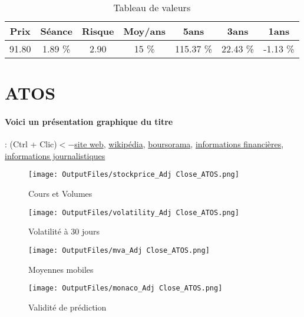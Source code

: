 \documentclass[11pt,a4paper]{report}%
\begin{document}
\begin{table}[H]
  \centering
    \begin{tabular}{|c|c|c|c|c|c|c|}
    \hline
    Prix & Séance & Risque  & Moy/ans & 5ans & 3ans & 1ans \\
    \hline
    91.80 &    1.89 \%    & 2.90 & 15 \% & 115.37 \% & 22.43 \% & -1.13 \% \\
    \hline
    \end{tabular}%
        \label{tab:table_ALTEN}%
      \caption{Tableau de valeurs}
\end{table}%

\newpage

\section{ATOS}

\paragraph{Voici un présentation graphique du titre} : (Ctrl + Clic)$<-$\href{https://atos.net/fr/investisseurs}{site web}, \href{https://fr.wikipedia.org/wiki/Atos}{wikipédia}, \href{https://www.boursorama.com/cours/1rPATO}{boursorama}, \href{https://www.qwant.com/?q=site:https:%2f%2fwww.easybourse.com%2faction-societe%2fATOS&t=web&client=ext-firefox-hp}{informations financières}, \href{https://bourse.lerevenu.com/cours-de-bourse/fiche-valeur-synthese/ATOS/ATO-FR}{informations journalistiques}
\begin{figure}[!htb]
   \begin{minipage}{0.5\textwidth}
     \centering
     \texttt{[image: OutputFiles/stockprice\_Adj Close\_ATOS.png]}
     \caption{Cours et Volumes}\label{Fig:price_ATOS}
   \end{minipage}\hfill
   \begin{minipage}{0.5\textwidth}
     \centering
     \texttt{[image: OutputFiles/volatility\_Adj Close\_ATOS.png]}
     \caption{Volatilité à 30 jours}\label{Fig:volat_ATOS}
   \end{minipage}
\end{figure}
\begin{figure}[!htb]
   \begin{minipage}{0.5\textwidth}
     \centering
     \texttt{[image: OutputFiles/mva\_Adj Close\_ATOS.png]}
     \caption{Moyennes mobiles}\label{Fig:mva_ATOS}
   \end{minipage}\hfill
   \begin{minipage}{0.5\textwidth}
     \centering
     \texttt{[image: OutputFiles/monaco\_Adj Close\_ATOS.png]}
     \caption{Validité de prédiction}\label{Fig:prediction_ATOS}
   \end{minipage}
\end{figure}
\end{document}
